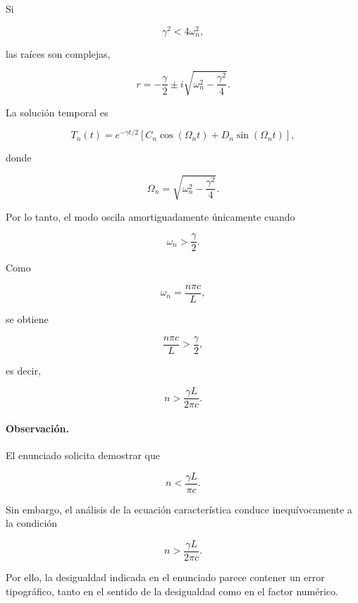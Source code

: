 \documentclass[12pt]{article}
\begin{document}
Si

\[
\gamma^2<4\omega_n^2,
\]

las raíces son complejas,

\begin{equation}
r=
-\frac{\gamma}{2}
\pm
i
\sqrt{\omega_n^2-\frac{\gamma^2}{4}}.
\end{equation}

La solución temporal es

\begin{equation}
T_n(t)=
e^{-\gamma t/2}
\left[
C_n\cos(\Omega_nt)
+
D_n\sin(\Omega_nt)
\right],
\end{equation}

donde

\begin{equation}
\Omega_n=
\sqrt{
\omega_n^2-\frac{\gamma^2}{4}
}.
\end{equation}

Por lo tanto, el modo oscila amortiguadamente únicamente cuando

\begin{equation}
\omega_n>\frac{\gamma}{2}.
\end{equation}

Como

\[
\omega_n=\frac{n\pi c}{L},
\]

se obtiene

\begin{equation}
\frac{n\pi c}{L}>
\frac{\gamma}{2},
\end{equation}

es decir,

\begin{equation}
\boxed{
n>
\frac{\gamma L}{2\pi c}.
}
\end{equation}

\paragraph{Observación.}

El enunciado solicita demostrar que

\[
n<
\frac{\gamma L}{\pi c}.
\]

Sin embargo, el análisis de la ecuación característica conduce inequívocamente a la condición

\[
n>
\frac{\gamma L}{2\pi c}.
\]

Por ello, la desigualdad indicada en el enunciado parece contener un error tipográfico, tanto en el sentido de la desigualdad como en el factor numérico.
\end{document}
